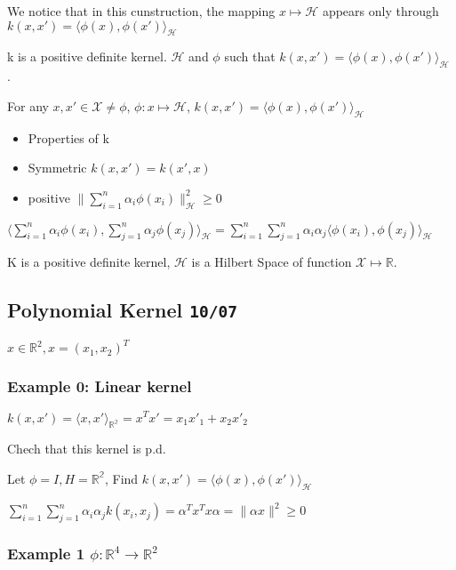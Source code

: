 \documentclass[10pt,portrait]{article}
\begin{document}
We notice that in this cunstruction, the mapping \(x\mapsto\mathcal{H}\)
appears only through
\(k(x,x')=\langle\phi(x),\phi(x')\rangle_{\mathcal{H}}\)

k is a positive definite kernel. \(\mathcal{H}\) and \(\phi\) such that
\(k(x,x')=\langle\phi(x),\phi(x')\rangle_{\mathcal{H}}\) .

For any \(x,x'\in\mathcal{X}\neq\phi\), \(\phi: x \mapsto \mathcal{H}\),
\(k(x,x')=\langle\phi(x),\phi(x')\rangle_{\mathcal{H}}\)

\begin{itemize}
\item
  Properties of k
\item
  Symmetric \(k(x,x')=k(x',x)\)
\item
  positive \(\|\sum_{i=1}^n\alpha_i\phi(x_i)\|_{\mathcal{H}}^2\ge0\)
\end{itemize}

\(\langle\sum_{i=1}^n\alpha_i\phi(x_i),\sum_{j=1}^n\alpha_j\phi(x_j)\rangle_{\mathcal{H}}=\sum_{i=1}^n\sum_{j=1}^n\alpha_i\alpha_j\langle\phi(x_i),\phi(x_j)\rangle_{\mathcal{H}}\)

K is a positive definite kernel, \(\mathcal{H}\) is a Hilbert Space of
function \(\mathcal{X}\mapsto\mathbb{R}\).

\hypertarget{polynomial-kernel-1007}{%
\subsection{\texorpdfstring{Polynomial Kernel
\texttt{10/07}}{Polynomial Kernel 10/07}}\label{polynomial-kernel-1007}}

\(x\in\mathbb{R}^2, x=(x_1,x_2)^T\)

\hypertarget{example-0-linear-kernel}{%
\subsubsection{Example 0: Linear kernel}\label{example-0-linear-kernel}}

\(k(x,x')=\langle x,x'\rangle_\mathbb{R^2}=x^Tx'=x_1x'_1+x_2x'_2\)

Chech that this kernel is p.d.

Let \(\phi=I,H=\mathbb{R^2}\), Find
\(k(x,x')=\langle\phi(x),\phi(x')\rangle_{\mathcal{H}}\)

\(\sum_{i=1}^n\sum_{j=1}^n\alpha_i\alpha_jk(x_i,x_j)=\alpha^Tx^Tx\alpha=\|\alpha x\|^2\ge0\)

\hypertarget{example-1-phi-mathbbr4tomathbbr2}{%
\subsubsection{\texorpdfstring{Example 1
\(\phi: \mathbb{R}^4\to\mathbb{R}^{2}\)}{Example 1 \textbackslash{}phi: \textbackslash{}mathbb\{R\}\^{}4\textbackslash{}to\textbackslash{}mathbb\{R\}\^{}\{2\}}}\label{example-1-phi-mathbbr4tomathbbr2}}
\end{document}

